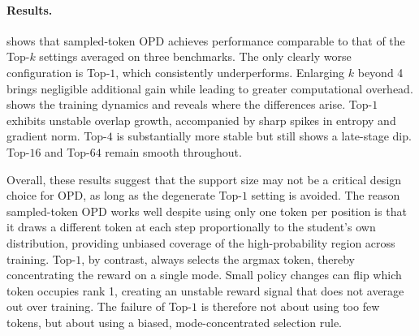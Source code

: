 \paragraph{Results.}
 shows that sampled-token OPD achieves performance comparable to that of the Top-$k$ settings averaged on three benchmarks. The only clearly worse configuration is Top-$1$, which consistently underperforms. Enlarging $k$ beyond 4 brings negligible additional gain while leading to greater computational overhead.
 shows the training dynamics and reveals where the differences arise. Top-$1$ exhibits unstable overlap growth, accompanied by sharp spikes in entropy and gradient norm. Top-$4$ is substantially more stable but still shows a late-stage dip. Top-$16$ and Top-$64$ remain smooth throughout.

Overall, these results suggest that the support size may not be a critical design choice for OPD, as long as the degenerate Top-$1$ setting is avoided. The reason sampled-token OPD works well despite using only one token per position is that it draws a different token at each step proportionally to the student's own distribution, providing unbiased coverage of the high-probability region across training. Top-$1$, by contrast, always selects the argmax token, thereby concentrating the reward on a single mode. Small policy changes can flip which token occupies rank 1, creating an unstable reward signal that does not average out over training. The failure of Top-$1$ is therefore not about using too few tokens, but about using a biased, mode-concentrated selection rule.






